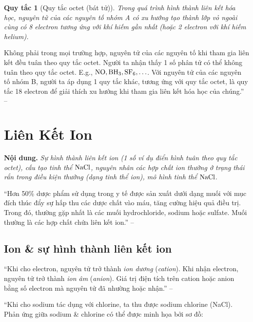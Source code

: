 \documentclass[oneside]{book}
\numberwithin{equation}{section}
\newtheorem{quytac}{Quy tắc}[section]
\begin{document}
\begin{quytac}[Quy tắc octet (bát tử)]
	Trong quá trình hình thành liên kết hóa học, nguyên tử của các nguyên tố nhóm A có xu hướng tạo thành lớp vỏ ngoài cùng có 8 electron tương ứng với khí hiếm gần nhất (hoặc 2 electron với khí hiếm helium).
\end{quytac}
Không phải trong mọi trường hợp, nguyên tử của các nguyên tố khi tham gia liên kết đều tuân theo quy tắc octet. Người ta nhận thấy 1 số phân tử có thể không tuân theo quy tắc octet. E.g., $\rm NO,BH_3,SF_6,\ldots$. Với nguyên tử của các nguyên tố nhóm B, người ta áp dụng 1 quy tắc khác, tương ứng với quy tắc octet, là quy tắc 18 electron để giải thích xu hướng khi tham gia liên kết hóa học của chúng.'' -- \cite[pp. 53--54]{SGK_Hoa_Hoc_10_Chan_Troi_Sang_Tao}


\section{Liên Kết Ion}
\textbf{Nội dung.} \textit{Sự hình thành liên kết ion (1 số ví dụ điển hình tuân theo quy tắc octet), cấu tạo tinh thể $\rm NaCl$, nguyên nhân các hợp chất ion thường ở trạng thái rắn trong điều kiện thường (dạng tinh thể ion), mô hình tinh thể $\rm NaCl$}.

``Hơn 50\% dược phẩm sử dụng trong y tế được sản xuất dưới dạng muối với mục đích thúc đẩy sự hấp thu các dược chất vào máu, tăng cường hiệu quả điều trị. Trong đó, thường gặp nhất là các muối hydrochloride, sodium hoặc sulfate. Muối thường là các hợp chất chứa liên kết ion.'' -- \cite[p. 55]{SGK_Hoa_Hoc_10_Chan_Troi_Sang_Tao}

\subsection{Ion \& sự hình thành liên kết ion}
``Khi cho electron, nguyên tử trở thành \textit{ion dương} (\textit{cation}). Khi nhận electron, nguyên tử trở thành \textit{ion âm} (\textit{anion}). Giá trị điện tích trên cation hoặc anion bằng số electron mà nguyên tử đã nhường hoặc nhận.'' -- \cite[p. 55]{SGK_Hoa_Hoc_10_Chan_Troi_Sang_Tao}

``Khi cho sodium tác dụng với chlorine, ta thu được sodium chlorine (NaCl). Phản ứng giữa sodium \& chlorine có thể được minh họa bởi sơ đồ:
\end{document}
